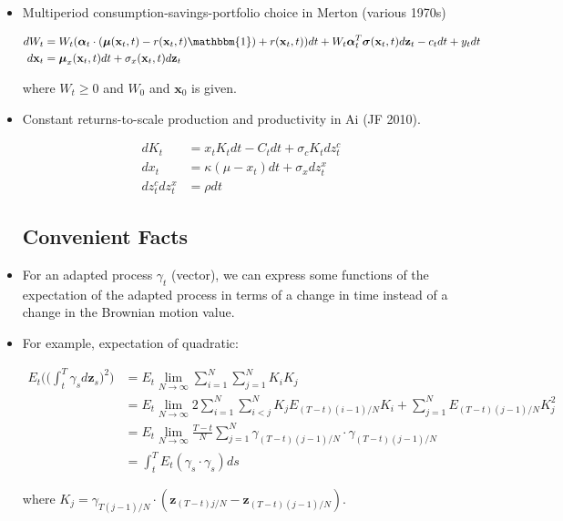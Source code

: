 \documentclass{article}
\newcommand{\xbf}{\mathbf{x}}
\newcommand{\zbf}{\mathbf{z}}
\newcommand{\mubf}{\boldsymbol{\mu}}
\newcommand{\alphabf}{\boldsymbol{\alpha}}
\newcommand{\sigmabf}{\boldsymbol{\sigma}}
\newcommand{\onebf}{\mathbbm{1}}
\begin{document}
\begin{itemize}
\item Multiperiod consumption-savings-portfolio choice in Merton (various 1970s)

\begin{align*}
dW_t &= W_t (\alphabf_t \cdot (\mubf(\xbf_t, t) - r(\xbf_t, t)\onebf) + r(\xbf_t, t)) dt +W_t \alphabf_t^T \sigmabf(\xbf_t, t)d\zbf_t - c_t dt + y_tdt \\
d \xbf_t &= \mubf_x (\xbf_t, t) dt + \sigma_x (\xbf_t, t) d\zbf_t
\end{align*}

where $W_t \ge 0$ and $W_0$ and $\xbf_0$ is given.

\item Constant returns-to-scale production and productivity in Ai (JF 2010).

\begin{align*}
dK_t &= x_t K_t dt - C_t dt + \sigma_c K_t dz_t^c \\
dx_t &= \kappa (\mu - x_t) dt + \sigma_x dz_t^x\\
dz_t^c dz_t^x &= \rho dt
\end{align*}

\subsection*{Convenient Facts}

\item For an adapted process $\gamma_t$ (vector), we can express some functions of the expectation of the adapted process in terms of a change in time instead of a change in the Brownian motion value.

\item For example, expectation of quadratic:

\begin{align}
E_t \Bigg( \Bigg( \int_t^T \gamma_s d\zbf_s \Bigg)^2 \Bigg) \nonumber
&= E_t \lim_{N \to \infty} \sum_{i=1}^N \sum_{j=1}^N K_i K_j \nonumber\\
&= E_t \lim_{N \to \infty} 2\sum_{i=1}^N \sum_{i<j}^N K_j E_{(T-t)(i-1)/N} K_i + \sum_{j=1}^N E_{(T-t)(j-1)/N} K_j^2 \nonumber\\
&= E_t \lim_{N \to \infty} \frac{T - t}{N} \sum_{j=1}^N \gamma_{(T-t)(j-1)/N} \cdot \gamma_{(T-t)(j-1)/N} \nonumber\\
&= \int_t^T E_t (\gamma_s \cdot \gamma_s) ds \label{cfq}
\end{align}

where $K_j = \gamma_{T(j-1)/N} \cdot (\zbf_{(T-t)j/N} - \zbf_{(T-t)(j-1)/N})$.


\end{itemize}
\end{document}
